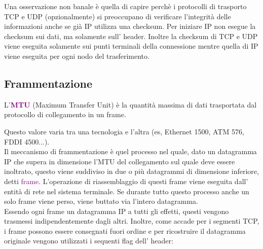 Una osservazione non banale è quella di capire perchè i protocolli di trasporto TCP e UDP (opzionalmente) si preoccupano di verificare l'integrità delle informazioni anche se già IP utilizza una checksum.
Per iniziare IP non esegue la checksum sui dati, ma solamente sull' header. Inoltre la checksum di TCP e UDP viene eseguita solamente sui punti terminali della connessione mentre quella di IP viene eseguita per ogni nodo del trasferimento.

\subsection{Frammentazione}
\begin{definition}
    L'\textbf{\textcolor{purple}{MTU}} (Maximum Transfer Unit) è la quantità massima di dati trasportata dal protocollo di collegamento in un frame.
\end{definition}
Questo valore varia tra una tecnologia e l'altra (es, Ethernet 1500, ATM 576, FDDI 4500...).
\\Il meccanismo di frammentazione è quel processo nel quale, dato un datagramma IP che supera in dimensione l'MTU del collegamento sul quale deve essere inoltrato, questo viene suddiviso in due o più datagrammi di dimensione inferiore, detti \textcolor{purple}{frame}.
L'operazione di riassemblaggio di questi frame viene eseguita dall' entità di rete nel sistema terminale. 
Se durante tutto questo processo anche un solo frame viene perso, viene buttato via l'intero datagramma.
\\Essendo ogni frame un datagramma IP a tutti gli effetti, questi vengono trasmessi indipendentemente dagli altri.
Inoltre, come accade per i segmenti TCP, i frame possono essere consegnati fuori ordine e per ricostruire il datagramma originale vengono utilizzati i sequenti flag dell' header:
